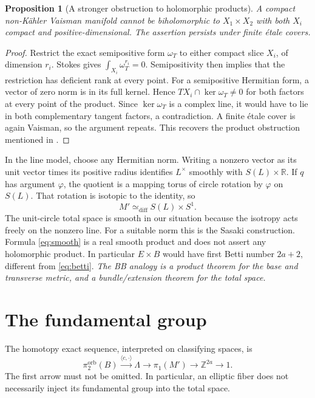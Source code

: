 \documentclass[12pt]{amsart}
\newtheorem{prop}[thm]{Proposition}
\theoremstyle{definition}
\theoremstyle{remark}
\numberwithin{equation}{section}
\newcommand{\orb}{\mathrm{orb}}
\newcommand{\R}{\mathbb{R}}
\newcommand{\Z}{\mathbb{Z}}
\newcommand{\wt}{\omega_{T}}
\begin{document}
\begin{prop}[A stronger obstruction to holomorphic products]\label{prop:noproduct}
A compact non-K\"ahler Vaisman manifold cannot be biholomorphic to
$X_1\times X_2$ with both $X_i$ compact and positive-dimensional.
The assertion persists under finite \'etale covers.
\end{prop}
\begin{proof}
Restrict the exact semipositive form $\wt$ to either compact slice
$X_i$, of dimension $r_i$. Stokes gives
$\int_{X_i}\wt^{r_i}=0$. Semipositivity then implies that the
restriction has deficient rank at every point. For a semipositive
Hermitian form, a vector of zero norm is in its full kernel. Hence
$T X_i\cap\ker\wt\ne0$ for both factors at every point of the
product. Since $\ker\wt$ is a complex line, it would have to lie in
both complementary tangent factors, a contradiction. A finite \'etale
cover is again Vaisman, so the argument repeats. This recovers the
product obstruction mentioned in \cite[Introduction]{Istrati}.
\end{proof}

In the line model, choose any Hermitian norm. Writing a nonzero vector
as its unit vector times its positive radius identifies $L^{\times}$
smoothly with $S(L)\times\R$. If $q$ has argument $\varphi$, the
quotient is a mapping torus of circle rotation by $\varphi$ on $S(L)$.
That rotation is isotopic to the identity, so
\begin{equation}\label{eq:smooth}
M'\simeq_{\mathrm{diff}} S(L)\times S^1.
\end{equation}
The unit-circle total space is smooth in our situation because the
isotropy acts freely on the nonzero line. For a suitable norm this
is the Sasaki construction. Formula \eqref{eq:smooth} is a real smooth
product and does not assert any holomorphic product. In particular
$E\times B$ would have first Betti number $2a+2$, different from
\eqref{eq:betti}. \emph{The BB analogy is a product theorem for the
base and transverse metric, and a bundle/extension theorem for the
total space.}

\section{The fundamental group}\label{sec:pi}
The homotopy exact sequence, interpreted on classifying spaces, is
\begin{equation}\label{eq:pi}
\pi_2^{\orb}(B)\xrightarrow{\langle c,\cdot\rangle}\Lambda
\longrightarrow\pi_1(M')\longrightarrow\Z^{2a}\longrightarrow1.
\end{equation}
The first arrow must not be omitted. In particular, an elliptic fiber
does not necessarily inject its fundamental group into the total space.
\end{document}
